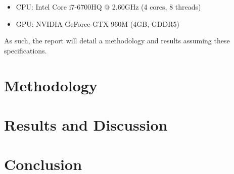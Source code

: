 \documentclass[12pt, a4paper]{article}
\begin{document}
\begin{itemize}
\item CPU: Intel Core i7-6700HQ @ 2.60GHz (4 cores, 8 threads)
\item GPU: NVIDIA GeForce GTX 960M (4GB, GDDR5) \\
\end{itemize}

As such, the report will detail a methodology and results assuming these specifications.

\section{Methodology}

\section{Results and Discussion}

\section{Conclusion}

\newpage


{}
\nocite{*}
\end{document}
